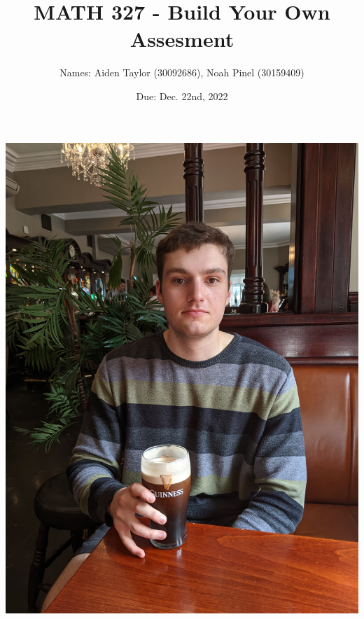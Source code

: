 \documentclass[11pt]{article}
\title{MATH 327 - Build Your Own Assesment}
\author{Names: Aiden Taylor (30092686), Noah Pinel (30159409)}
\date{Due: Dec. 22nd, 2022}
\begin{document}
\maketitle
\begin{center}
\includegraphics[scale=0.0536]{aiden}

\end{center}
\end{document}
